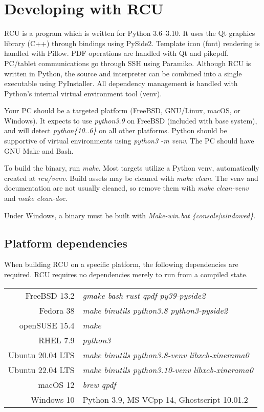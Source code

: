 \chapter{Developing with RCU}
\label{sec:developing}
RCU is a program which is written for Python 3.6--3.10. It uses the Qt graphics library (C++) through bindings using PySide2. Template icon (font) rendering is handled with Pillow. PDF operations are handled with Qt and pikepdf. PC/tablet communications go through SSH using Paramiko. Although RCU is written in Python, the source and interpreter can be combined into a single executable using PyInstaller. All dependency management is handled with Python's internal virtual environment tool (venv).

Your PC should be a targeted platform (FreeBSD, GNU/Linux, macOS, or Windows). It expects to use \textit{python3.9} on FreeBSD (included with base system), and will detect \textit{python\{10..6\}} on all other platforms. Python should be supportive of virtual environments using \textit{python3 -m venv}. The PC should have GNU Make and Bash.

To build the binary, run \textit{make}. Most targets utilize a Python venv, automatically created at \textit{rcu/venv}. Build assets may be cleaned with \textit{make clean}. The venv and documentation are not usually cleaned, so remove them with \textit{make clean-venv} and \textit{make clean-doc}.

Under Windows, a binary must be built with \textit{Make-win.bat \{console|windowed\}}.


\section{Platform dependencies}
\label{sec:platdeps}

When building RCU on a specific platform, the following dependencies are required. RCU requires no dependencies merely to run from a compiled state.

\vspace{0.5cm}
\begin{tabular}{ r | l }
  FreeBSD 13.2 & \textit{gmake bash rust qpdf py39-pyside2} \\
  Fedora 38 & \textit{make binutils python3.8 python3-pyside2} \\
  openSUSE 15.4 & \textit{make} \\
  RHEL 7.9 & \textit{python3} \\
  Ubuntu 20.04 LTS & \textit{make binutils python3.8-venv libxcb-xinerama0} \\
  Ubuntu 22.04 LTS & \textit{make binutils python3.10-venv libxcb-xinerama0} \\
  macOS 12 & \textit{brew qpdf} \\
  Windows 10 & Python 3.9, MS VCpp 14, Ghostscript 10.01.2 \\
\end{tabular}



